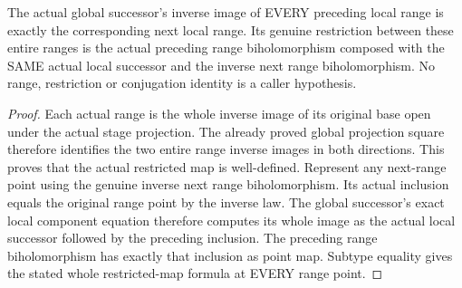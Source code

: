 \begin{theorem}
\label{hir:sharp-actual-curve-successor-saturated-range-map}
\leanok
The actual global successor's inverse image of EVERY preceding local
range is exactly the corresponding next local range. Its genuine
restriction between these entire ranges is the actual preceding range
biholomorphism composed with the SAME actual local successor and the
inverse next range biholomorphism. No range, restriction or conjugation
identity is a caller hypothesis.
\end{theorem}
\begin{proof}
Each actual range is the whole inverse image of its original base open
under the actual stage projection. The already proved global projection
square therefore identifies the two entire range inverse images in both
directions. This proves that the actual restricted map is well-defined.
Represent any next-range point using the genuine inverse next range
biholomorphism. Its actual inclusion equals the original range point by
the inverse law. The global successor's exact local component equation
therefore computes its whole image as the actual local successor followed
by the preceding inclusion. The preceding range biholomorphism has exactly
that inclusion as point map. Subtype equality gives the stated whole
restricted-map formula at EVERY range point.
\end{proof}

